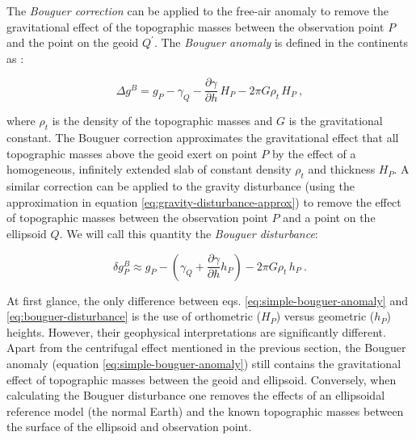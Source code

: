 \documentclass[manuscript]{geophysics}
\begin{document}
The \textit{Bouguer correction} can be applied to the free-air anomaly
to remove the gravitational effect of the topographic masses
between the observation point $P$ and the point on the geoid $Q^\prime$.
The \textit{Bouguer anomaly} is defined in the continents as
\citep{blakely1996, hofmann-wellenhof-moritz2005}:

\begin{equation}
\Delta g^{B} = g_{P}
- \gamma_{Q}
- \frac{\partial \gamma}{\partial h} \, H_{P}
- 2 \pi G \rho_{t} \, H_{P}
\: ,
\label{eq:simple-bouguer-anomaly}
\end{equation}

\noindent
where $\rho_t$ is the density of the topographic masses and $G$ is the
gravitational constant.
The Bouguer correction approximates the gravitational effect that all
topographic masses above the geoid exert on point $P$ by the effect of a
homogeneous, infinitely extended slab of constant density $\rho_{t}$ and
thickness $H_{P}$.
A similar correction can be applied to the gravity disturbance
(using the approximation in equation \ref{eq:gravity-disturbance-approx})
to remove the effect of topographic masses between
the observation point $P$ and a point on the ellipsoid $Q$.
We will call this quantity the \textit{Bouguer disturbance}:

\begin{equation}
\delta g_P^{B} \approx
g_{P} -
\left( \gamma_{Q} + \frac{\partial \gamma}{\partial h} h_P \right)
- 2 \pi G \rho_{t} \, h_{P} \: .
\label{eq:bouguer-disturbance}
\end{equation}

At first glance, the only difference between eqs.
\ref{eq:simple-bouguer-anomaly} and \ref{eq:bouguer-disturbance} is the use of
orthometric ($H_P$) versus geometric ($h_P$) heights.
However, their geophysical interpretations are significantly different.
Apart from the centrifugal effect mentioned in the previous section,
the Bouguer anomaly (equation \ref{eq:simple-bouguer-anomaly}) still contains
the gravitational effect of topographic masses between the geoid and ellipsoid.
Conversely, when calculating the Bouguer disturbance one removes the effects of
an ellipsoidal reference model (the normal Earth) and the known topographic
masses between the surface of the ellipsoid and observation point.
\end{document}
